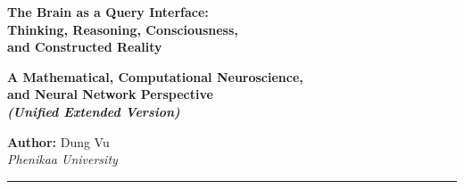 \documentclass[12pt,a4paper]{article}
\theoremstyle{plain}
\theoremstyle{definition}
\theoremstyle{remark}
\begin{document}
\thispagestyle{empty}

\begin{center}
  {\footnotesize\color{gray}}

  \vspace{1.8cm}
  {\LARGE\bfseries\color{hdrcol}
    The Brain as a Query Interface:\\[6pt]
    Thinking, Reasoning, Consciousness,\\[4pt]
    and Constructed Reality
  }

  \vspace{0.5cm}
  {\large\bfseries\color{blue!35!black}
    A Mathematical, Computational Neuroscience,\\
    and Neural Network Perspective\\[4pt]
    \textit{(Unified Extended Version)}
  }

  \vspace{1.2cm}
  {\normalsize
    \textbf{Author:} Dung Vu \\[4pt]
    \textit{Phenikaa University}
  }

  \vspace{0.6cm}
  \rule{0.7\linewidth}{0.4pt}
\end{center}

\vspace{0.4cm}
\end{document}
